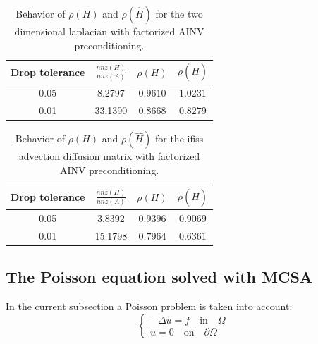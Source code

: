 \documentclass[a4paper,10pt]{article}
\begin{document}
\begin{table}[!h]
\centering
\begin{tabular}{|c|c|c|c|}
\hline
\textbf{Drop tolerance} & \textbf{$\frac{nnz(H)}{nnz(A)}$}& $\rho(H)$ 
&$\rho(\hat{H})$\\
\hline
 0.05 & 8.2797 & $0.9610$ & $1.0231$\\
\hline 
 0.01 & 33.1390 & $0.8668$ & $0.8279$\\
\hline
\end{tabular}
\caption{Behavior of $\rho(H)$ and $\rho(\hat{H})$ for the two dimensional 
laplacian with factorized AINV preconditioning.} 
\label{tab:lap2d_ainv}
\end{table}

\begin{table}[!h]
\centering
\begin{tabular}{|c|c|c|c|}
\hline
\textbf{Drop tolerance} & \textbf{$\frac{nnz(H)}{nnz(A)}$}& $\rho(H)$ 
&$\rho(\hat{H})$\\
\hline
 0.05 & 3.8392 & $0.9396$ & $0.9069$\\
\hline 
 0.01 & 15.1798 & $0.7964$ & $0.6361$\\
\hline
\end{tabular}
\caption{Behavior of $\rho(H)$ and $\rho(\hat{H})$ for the ifiss advection 
diffusion matrix with factorized AINV preconditioning.} 
\label{tab:ifiss_ainv}
\end{table}

\subsection{The Poisson equation solved with MCSA}
In the current subsection a Poisson problem is taken into account:
\begin{equation}
\begin{cases}
 -\Delta u = f \quad \text{in}\quad \Omega \\
 u=0\quad \text{on} \quad \partial\Omega
 \end{cases}
\end{equation}
\end{document}
